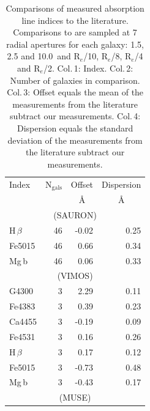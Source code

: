 \documentclass[a4paper,fleqn,usenatbib]{mnras}
\begin{document}
		\begin{table}
			\centering
			\caption{Comparisons of measured absorption line indices to the literature. Comparisons to \citet{Rampazzo2005} are sampled at 7 radial apertures for each galaxy: 1.5, 2.5 and 10.0\arcsec\ and R$_e$/10, R$_e$/8, R$_e$/4 and R$_e$/2. Col.\,1: Index. Col.\,2: Number of galaxies in comparison. Col.\,3: Offset equals the mean of the measurements from the literature subtract our measurements. Col.\,4: Dispersion equals the standard deviation of the measurements from the literature subtract our measurements.}
			\label{tab:litAbsorption}
			\begin{tabular}{l r r r}
				\hline
				\hline
				Index 		& \multicolumn{1}{c}{N$_\mathrm{gals}$} & \multicolumn{1}{c}{Offset} & \multicolumn{1}{c}{Dispersion} \\
							& 		&\multicolumn{1}{c}{\AA}& \multicolumn{1}{c}{\AA} \\
				\hline
				\multicolumn{4}{c}{\citet{Vazdekis2010} (SAURON)} \\
				\hline
				H\,$\beta$ 	& 46		& -0.02\leavevmode\phantom{0}& 0.25\leavevmode\phantom{0}	\\
				Fe5015		& 46		& 0.66\leavevmode\phantom{0}& 0.34\leavevmode\phantom{0}	\\
				Mg\,b 		& 46		& 0.06\leavevmode\phantom{0}& 0.33\leavevmode\phantom{0}	\\
				\hline
				\multicolumn{4}{c}{\citet{Rampazzo2005} (VIMOS)} \\
				\hline
				G4300 		& 3 		& 2.29\leavevmode\phantom{0}& 0.11\leavevmode\phantom{0}	\\
				Fe4383 		& 3 		& 0.39\leavevmode\phantom{0}& 0.23\leavevmode\phantom{0}	\\
				Ca4455 		& 3 		& -0.19\leavevmode\phantom{0}& 0.09\leavevmode\phantom{0}	\\
				Fe4531 		& 3 		& 0.16\leavevmode\phantom{0}& 0.26\leavevmode\phantom{0}	\\
				H\,$\beta$ 	& 3 		& 0.17\leavevmode\phantom{0}& 0.12\leavevmode\phantom{0}	\\
				Fe5015 		& 3 		& -0.73\leavevmode\phantom{0}& 0.48\leavevmode\phantom{0}	\\
				Mg\,b 		& 3 		& -0.43\leavevmode\phantom{0}& 0.17\leavevmode\phantom{0}	\\
				\hline
				\multicolumn{4}{c}{\citet{Rampazzo2005} (MUSE)} \\

\end{tabular}
\end{table}
\end{document}
